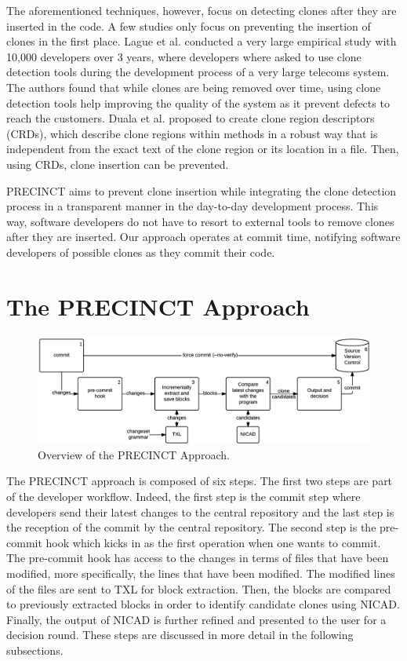 \documentclass[conference]{IEEEtran}
\begin{document}
The aforementioned  techniques, however, focus on detecting clones after they are inserted in the code. A few studies only focus on preventing the insertion of clones in the first place. Lague et al. \cite{Lague} conducted a very large empirical study with 10,000 developers over 3 years, where developers where asked to use clone detection tools during the development process of a very large telecoms system. The authors found that while clones are being removed over time, using clone detection tools help improving the quality of the system as it prevent defects to reach the customers. Duala et al. \cite{Duala-Ekoko2007,Duala-Ekoko2010} proposed to create clone region descriptors (CRDs), which describe clone regions within methods in a robust way that is independent from the exact text of the clone region or its location in a file. Then, using CRDs, clone insertion can be prevented.

PRECINCT aims to prevent clone insertion while integrating the clone detection process in a transparent manner in the day-to-day development process. This way, software developers do not have to resort to external tools to remove clones after they are inserted. Our approach operates at commit time, notifying software developers of possible clones as they commit their code.


\section{The PRECINCT Approach}
\label{sec:The PRECINCT Approach}

\begin{figure}
  \centering
    \includegraphics[width=\textwidth]{media/approach.png}
    \caption{ Overview of the PRECINCT Approach.\label{fig:precinct-approach}}
\end{figure}

The PRECINCT approach is composed of six steps.
The first two steps are part of the developer workflow.
Indeed, the first step is the commit step where developers send their latest changes to the central repository and the last step is the reception of the commit by the central repository.
The second step is the pre-commit hook which kicks in as the first operation when one wants to commit.
The pre-commit hook has access to the changes in terms of files that have been modified, more specifically, the lines that have been modified. The modified lines of the files are sent to TXL\cite{Cordy2006a} for block extraction. Then, the blocks are compared to previously extracted blocks in order to identify candidate clones  using NICAD\cite{Cordy2011}.
Finally, the output of NICAD is further refined and presented to the user for a decision round.
These steps are discussed in more detail in the following subsections.
\end{document}
